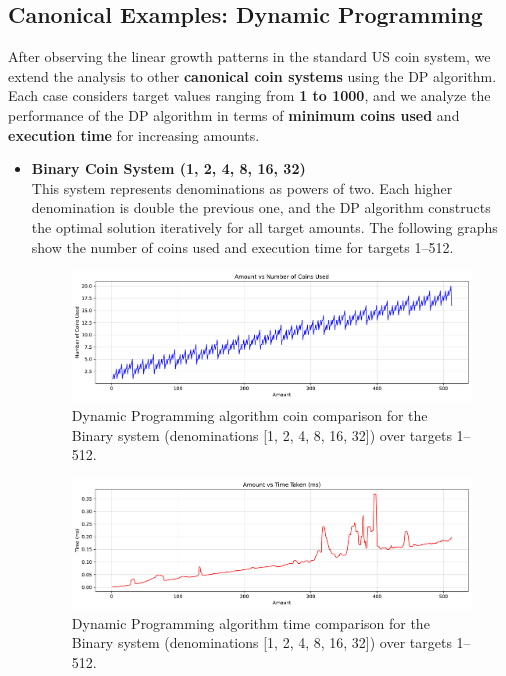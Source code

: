\documentclass[12pt,a4paper]{report}
\begin{document}
\subsection{Canonical Examples: Dynamic Programming}
After observing the linear growth patterns in the standard US coin system, we extend the analysis to other \textbf{canonical coin systems} using the DP algorithm. Each case considers target values ranging from \textbf{1 to 1000}, and we analyze the performance of the DP algorithm in terms of \textbf{minimum coins used} and \textbf{execution time} for increasing amounts.\\

\begin{itemize}
  \item \textbf{Binary Coin System (1, 2, 4, 8, 16, 32)}\\
  This system represents denominations as powers of two. Each higher denomination is double the previous one, and the DP algorithm constructs the optimal solution iteratively for all target amounts. The following graphs show the number of coins used and execution time for targets 1--512.\\
  \begin{figure}[H]
    \centering
    \includegraphics[width=\textwidth]{graphs/dp_coins_binary_plot.pdf}
    \caption{Dynamic Programming algorithm coin comparison for the Binary system (denominations [1, 2, 4, 8, 16, 32]) over targets 1--512.}
    \label{fig:dp_coins_binary_plot}
  \end{figure}

  \begin{figure}[H]
    \centering
    \includegraphics[width=\textwidth]{graphs/dp_time_binary_plot.pdf}
    \caption{Dynamic Programming algorithm time comparison for the Binary system (denominations [1, 2, 4, 8, 16, 32]) over targets 1--512.}
    \label{fig:dp_time_binary_plot}
  \end{figure}


\end{itemize}
\end{document}

